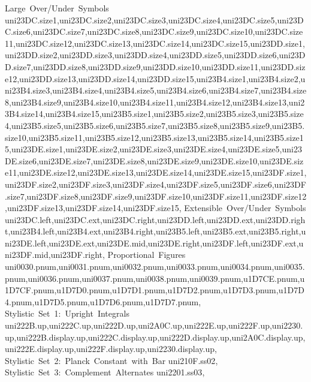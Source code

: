 {    {Large~Over/Under~Symbols} {uni23DC.size1,uni23DC.size2,uni23DC.size3,uni23DC.size4,uni23DC.size5,uni23DC.size6,uni23DC.size7,uni23DC.size8,uni23DC.size9,uni23DC.size10,uni23DC.size11,uni23DC.size12,uni23DC.size13,uni23DC.size14,uni23DC.size15,uni23DD.size1,uni23DD.size2,uni23DD.size3,uni23DD.size4,uni23DD.size5,uni23DD.size6,uni23DD.size7,uni23DD.size8,uni23DD.size9,uni23DD.size10,uni23DD.size11,uni23DD.size12,uni23DD.size13,uni23DD.size14,uni23DD.size15,uni23B4.size1,uni23B4.size2,uni23B4.size3,uni23B4.size4,uni23B4.size5,uni23B4.size6,uni23B4.size7,uni23B4.size8,uni23B4.size9,uni23B4.size10,uni23B4.size11,uni23B4.size12,uni23B4.size13,uni23B4.size14,uni23B4.size15,uni23B5.size1,uni23B5.size2,uni23B5.size3,uni23B5.size4,uni23B5.size5,uni23B5.size6,uni23B5.size7,uni23B5.size8,uni23B5.size9,uni23B5.size10,uni23B5.size11,uni23B5.size12,uni23B5.size13,uni23B5.size14,uni23B5.size15,uni23DE.size1,uni23DE.size2,uni23DE.size3,uni23DE.size4,uni23DE.size5,uni23DE.size6,uni23DE.size7,uni23DE.size8,uni23DE.size9,uni23DE.size10,uni23DE.size11,uni23DE.size12,uni23DE.size13,uni23DE.size14,uni23DE.size15,uni23DF.size1,uni23DF.size2,uni23DF.size3,uni23DF.size4,uni23DF.size5,uni23DF.size6,uni23DF.size7,uni23DF.size8,uni23DF.size9,uni23DF.size10,uni23DF.size11,uni23DF.size12,uni23DF.size13,uni23DF.size14,uni23DF.size15},
    {Extensible~Over/Under~Symbols} {uni23DC.left,uni23DC.ext,uni23DC.right,uni23DD.left,uni23DD.ext,uni23DD.right,uni23B4.left,uni23B4.ext,uni23B4.right,uni23B5.left,uni23B5.ext,uni23B5.right,uni23DE.left,uni23DE.ext,uni23DE.mid,uni23DE.right,uni23DF.left,uni23DF.ext,uni23DF.mid,uni23DF.right},
    {Proportional~Figures} {uni0030.pnum,uni0031.pnum,uni0032.pnum,uni0033.pnum,uni0034.pnum,uni0035.pnum,uni0036.pnum,uni0037.pnum,uni0038.pnum,uni0039.pnum,u1D7CE.pnum,u1D7CF.pnum,u1D7D0.pnum,u1D7D1.pnum,u1D7D2.pnum,u1D7D3.pnum,u1D7D4.pnum,u1D7D5.pnum,u1D7D6.pnum,u1D7D7.pnum},
    {Stylistic~Set~1:~Upright~Integrals} {uni222B.up,uni222C.up,uni222D.up,uni2A0C.up,uni222E.up,uni222F.up,uni2230.up,uni222B.display.up,uni222C.display.up,uni222D.display.up,uni2A0C.display.up,uni222E.display.up,uni222F.display.up,uni2230.display.up},
    {Stylistic~Set~2:~Planck~Constant~with~Bar} {uni210F.ss02},
    {Stylistic~Set~3:~Complement~Alternates} {uni2201.ss03},
  }

